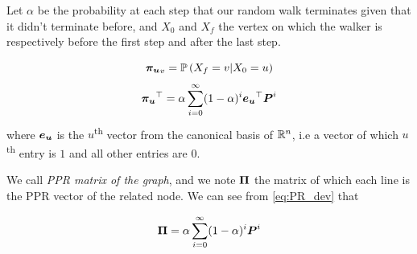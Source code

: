 Let $\alpha$ be the probability at each step that our random walk terminates given that it didn't terminate before, and $X_0$ and $X_f$ the vertex on which the walker is respectively before the first step and after the last step.

\begin{equation}
    \boldsymbol{\pi_u}_v = \mathbb{P}\left(X_f = v | X_0 = u\right)
\end{equation}
\begin{equation}\label{eq:PR_dev}
    \boldsymbol{\pi_u}^\top = \alpha\sum_{i=0}^\infty (1-\alpha)^i \boldsymbol{e_u}^\top \boldsymbol{P}^i
\end{equation}
\noindent where $\boldsymbol{e_u}$ is the $u$\textsuperscript{th} vector from the canonical basis of $\mathbb{R}^n$, i.e a vector of which $u$\textsuperscript{th} entry is $1$ and all other entries are $0$. %

We call \textit{PPR matrix of the graph}, and we note $\boldsymbol{\Pi}$ the matrix of which each line is the PPR vector of the related node. We can see from \eqref{eq:PR_dev} %
that 

\begin{equation}\label{eq:gen_PR_dev}
    \boldsymbol{\Pi} = \alpha\sum_{i=0}^\infty (1-\alpha)^i \boldsymbol{P}^i
\end{equation}

